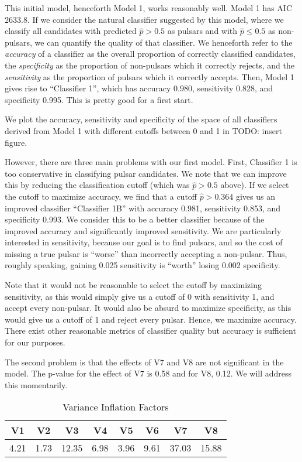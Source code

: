 \documentclass[11pt, oneside]{article}
\begin{document}
This initial model, henceforth Model 1, works reasonably well. Model 1 has AIC 2633.8. If we consider the natural classifier suggested by this model, where we classify all candidates with predicted $\hat{p} > 0.5$ as pulsars and with $\hat{p} \leq 0.5$ as non-pulsars, we can quantify the quality of that classifier. We henceforth refer to the \emph{accuracy} of a classifier as the overall proportion of correctly classified candidates, the \emph{specificity} as the proportion of non-pulsars which it correctly rejects, and the \emph{sensitivity} as the proportion of pulsars which it correctly accepts. Then, Model 1 gives rise to ``Classifier 1'', which has accuracy 0.980, sensitivity 0.828, and specificity 0.995.  This is pretty good for a first start. 

We plot the accuracy, sensitivity and specificity of the space of all classifiers derived from Model 1 with different cutoffs between 0 and 1 in {\color{red} TODO: insert figure}.

However, there are three main problems with our first model. First, Classifier 1 is too conservative in classifying pulsar candidates. We note that we can improve this by reducing the classification cutoff (which was $\hat{p} > 0.5$ above). If we select the cutoff to maximize accuracy, we find that a cutoff $\hat{p} > 0.364$ gives us an improved classifier ``Classifier 1B'' with accuracy 0.981, sensitivity 0.853, and specificity 0.993. We consider this to be a better classifier because of the improved accuracy and significantly improved sensitivity. We are particularly interested in sensitivity, because our goal is to find pulsars, and so the cost of missing a true pulsar is ``worse'' than incorrectly accepting a non-pulsar. Thus, roughly speaking, gaining 0.025 sensitivity is ``worth'' losing 0.002 specificity. 

Note that it would not be reasonable to select the cutoff by maximizing sensitivity, as this would simply give us a cutoff of 0 with sensitivity 1, and accept every non-pulsar. It would also be absurd to maximize specificity, as this would give us a cutoff of 1 and reject every pulsar. Hence, we maximize accuracy. There exist other reasonable metrics of classifier quality but accuracy is sufficient for our purposes. 

The second problem is that the effects of V7 and V8 are not significant in the model. The p-value for the effect of V7 is 0.58 and for V8, 0.12. We will address this momentarily. 

\begin{table}[h!]
\centering
\begin{tabular}{|c c c c c c c c|} 
 \hline
  V1  &  V2 &  V3 &   V4 &   V5&    V6  &  V7  &  V8 \\
  \hline
 4.21 & 1.73 &12.35 & 6.98 & 3.96 & 9.61& 37.03 &15.88 \\
  \hline
\end{tabular}
\caption{Variance Inflation Factors}
\label{table:vif}
\end{table}
\end{document}
